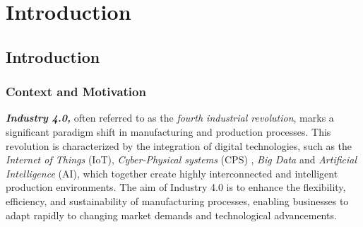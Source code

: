\graphicspath{{Figures}}
\part{Introduction}  %



\chapter{Introduction}
\label{ch:intro}
\textit{}



\section{Context and Motivation}
\label{sec:motivation}
\textit{\textbf{Industry 4.0,}} often referred to as the \textit{fourth industrial revolution}, marks a significant paradigm shift in manufacturing and production processes. This revolution is characterized by the integration of digital technologies, such as the \textit{Internet of Things} (IoT), \textit{ Cyber-Physical systems } (CPS) \cite{baheti2011cyber,rose2015internet}, \textit{Big Data} and \textit{Artificial Intelligence} (AI), which together create highly interconnected and intelligent production environments. The aim of Industry 4.0 is to enhance the flexibility, efficiency, and sustainability of manufacturing processes, enabling businesses to adapt rapidly to changing market demands and technological advancements.




